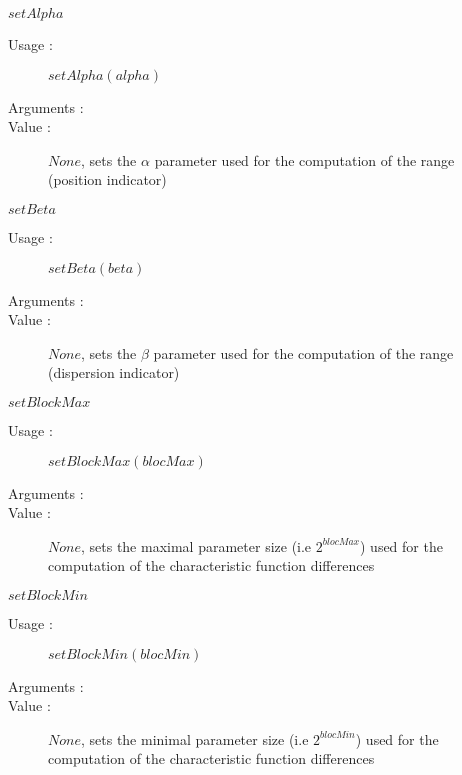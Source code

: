 \begin{description}
\begin{description}
\begin{description}
  \item $setAlpha$
    \begin{description}
    \item[Usage :]  $setAlpha(alpha)$
    \item[Arguments :]  \strut
    \item[Value :]  $None$, sets the $\alpha$ parameter used for the computation of the range (position indicator)
    \end{description}

  \item $setBeta$
    \begin{description}
    \item[Usage :] $setBeta(beta)$
    \item[Arguments :] \strut
    \item[Value :] $None$, sets the $\beta$ parameter used for the computation of the range (dispersion indicator)
    \end{description}

  \item $setBlockMax$
    \begin{description}
    \item[Usage :]  $setBlockMax(blocMax)$
    \item[Arguments :]  \strut
    \item[Value :] $None$, sets the maximal parameter size (i.e $2^{blocMax}$) used for the computation of the characteristic function differences
    \end{description}

  \item $setBlockMin$
    \begin{description}
    \item[Usage :]  $setBlockMin(blocMin)$
    \item[Arguments :]  \strut
    \item[Value :] $None$, sets the minimal parameter size (i.e $2^{blocMin}$) used for the computation of the characteristic function differences
    \end{description}


\end{description}
\end{description}
\end{description}
